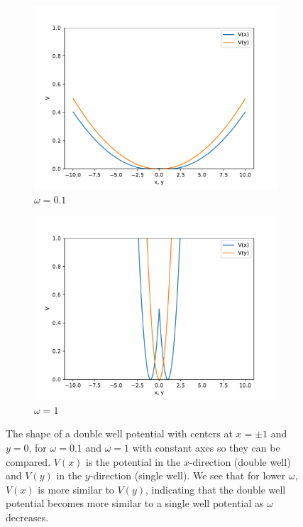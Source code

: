 \documentclass[../main.tex]{subfiles}
\begin{document}
\begin{figure}[!ht]
\centering
\begin{subfigure}{0.48\textwidth}
\includegraphics[width=\linewidth]{figures/DW_omega01}
\caption{$\omega=0.1$} \label{fig:DW_01}
\end{subfigure}\hspace*{\fill}
\begin{subfigure}{0.48\textwidth}
\includegraphics[width=\linewidth]{figures/DW_omega1}
\caption{$\omega=1$} \label{fig:DW_1}
\end{subfigure}

\caption{The shape of a double well potential with centers at $x=\pm1$ and $y=0$, for $\omega=0.1$ and $\omega=1$ with constant axes so they can be compared. $V(x)$ is the potential in the $x$-direction (double well) and $V(y)$ in the $y$-direction (single well). We see that for lower $\omega$, $V(x)$ is more similar to $V(y)$, indicating that the double well potential becomes more similar to a single well potential as $\omega$ decreases.} \label{fig:DW}
\end{figure}
\end{document}
